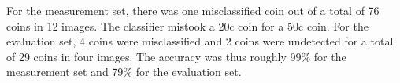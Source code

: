 \documentclass[doc/report.tex]{subfile}
\begin{document}
For the measurement set, there was one misclassified coin out of a total of 76
coins in 12 images. The classifier mistook a 20c coin for a 50c coin. For the
evaluation set, 4 coins were misclassified and 2 coins were undetected for a
total of 29 coins in four images. The accuracy was thus roughly 99\% for the
measurement set and 79\% for the evaluation set.
\end{document}
